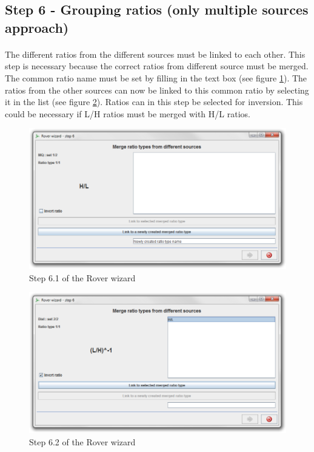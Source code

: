 \documentclass[11pt,a4paper,oneside,notitlepage]{book}
\begin{document}
\subsection{Step 6 - Grouping ratios (only multiple sources approach)}
\paragraph{}The different ratios from the different sources must be linked to each other. This step is necessary because the correct ratios from different source must be merged. The common ratio name must be set by filling in the text box (see figure \ref{step6_1}). The ratios from the other sources can now be linked to this common ratio by selecting it in the list (see figure \ref{step6_2}). Ratios can in this step be selected for inversion. This could be necessary if L/H ratios must be merged with H/L ratios.

\begin{figure}[H]
\begin{center}
\includegraphics[scale=0.4]{Rover_wizard_-_step_6_1.png}
\caption{Step 6.1 of the Rover wizard}
\label{step6_1}
\end{center}
\end{figure}


\begin{figure}[H]
\begin{center}
\includegraphics[scale=0.4]{Rover_wizard_-_step_6_2.png}
\caption{Step 6.2 of the Rover wizard}
\label{step6_2}
\end{center}
\end{figure}
\end{document}
